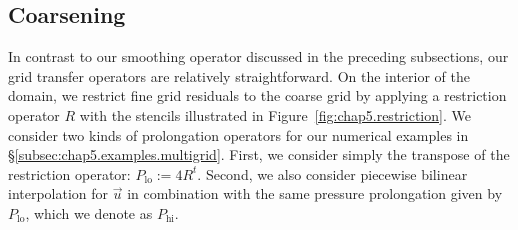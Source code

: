 \subsection{Coarsening} \label{subsec:chap5.multigrid.coarsening}

In contrast to our smoothing operator discussed in the preceding subsections, our grid transfer operators are relatively straightforward. On the interior of the domain, we restrict fine grid residuals to the coarse grid by applying a restriction operator $R$ with the stencils illustrated in Figure~\ref{fig:chap5.restriction}. We consider two kinds of prolongation operators for our numerical examples in \S\ref{subsec:chap5.examples.multigrid}. First, we consider simply the transpose of the restriction operator: $P_{\text{lo}} := 4 R^t$. Second, we also consider piecewise bilinear interpolation for $\vec{u}$ in combination with the same pressure prolongation given by $P_{\text{lo}}$, which we denote as $P_{\text{hi}}$.

